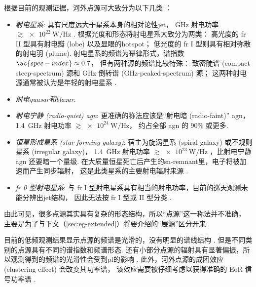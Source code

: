 根据目前的观测证据，河外点源可大致分为以下几类 \cite{padovani2016}：
\begin{itemize}
  \item \emph{射电星系}:
    具有尺度远大于星系本身的相对论性\ac{jet}，
    \si{\GHz} 射电功率 $\gtrsim \SI{e22}{\watt\per\hertz}$ \cite{ledlow1996}.
     根据光度和形态将射电星系大致分为两类：
    高光度的 \ac{fr} II 型具有射电瓣 (lobe) 以及显眼的\ac{hotspot}；
    低光度的 \ac{fr} I 型则具有相对弥散的射电羽 (plume).
    射电星系的频谱为幂律形式，谱指数 $\ac{spec-index} \approx 0.7$，
    但有两种源的频谱比较特殊：
    致密陡谱 (compact steep-spectrum) 源和
    GHz 倒转谱 (GHz-peaked-spectrum) 源；
    这两种射电源通常被认为是年轻的射电星系 \cite{oDea1998,sadler2016}.

  \item \emph{射电\ac{quasar}和\ac{blazar}}.

  \item \emph{射电宁静 (radio-quiet) \ac{agn}}:
    更准确的称法应该是\enquote{射电暗 (radio-faint)} \ac{agn}，
    \SI{1.4}{\GHz} 射电功率 $\gtrsim \SI{e24}{\watt\per\hertz}$，
    约占全部 \ac{agn} 的 90\% 或更多.

  \item \emph{恒星形成星系 (star-forming galaxy)}:
    宿主为旋涡星系 (spiral galaxy) 或不规则星系 (irregular galaxy)，
    \SI{1.4}{\GHz} 射电功率 $\gtrsim \SI{e23}{\watt\per\hertz}$
    \cite{mauch2007}，比射电宁静 \ac{agn} 还要暗一个量级.
    在大质量恒星死亡后产生的\ac{sn-remnant}里，电子将被加速而产生同步辐射，
    这是此类星系的主要射电辐射来源 \cite{condon1992}.

  \item \emph{\ac{fr} 0 型射电星系}:
    与 \ac{fr} I 型射电星系具有相当的射电功率，目前的巡天观测未能分辨出\ac{jet}结构，
    因此无法按 \ac{fr} I 型或 II 型分类 \cite{baldi2010,baldi2015}.
\end{itemize}
由此可见，很多点源其实具有复杂的形态结构，所以\enquote{点源}这一称法并不准确，
主要是为了与下文（\autoref{sec:eg-extended}）将要介绍的\enquote{展源}区分开来.

目前的低频观测结果显示点源的频谱是光滑的，没有明显的谱线结构 \cite{offringa2016}.
但是不同类别的点源具有不同的谱指数和频谱形态.
还有小部分点源的辐射具有显著偏振，所以观测得到的频谱的光滑性会受到\ac{pl}的影响
\cite{geil2011,vanEck2018}.
此外，河外点源的成团效应 (clustering effect) 会改变其功率谱，
该效应需要被仔细考虑以获得准确的 EoR 信号功率谱
\cite{diMatteo2002,diMatteo2004,liu2011,alonso2015,murray2017}.

